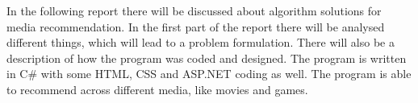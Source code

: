 In the following report there will be discussed about algorithm solutions for media recommendation. In the first part of the report there will be analysed different things, which will lead to a problem formulation. There will also be a description of how the program was coded and designed. The program is written in C\# with some HTML, CSS and ASP.NET coding as well. The program is able to recommend across different media, like movies and games.  
